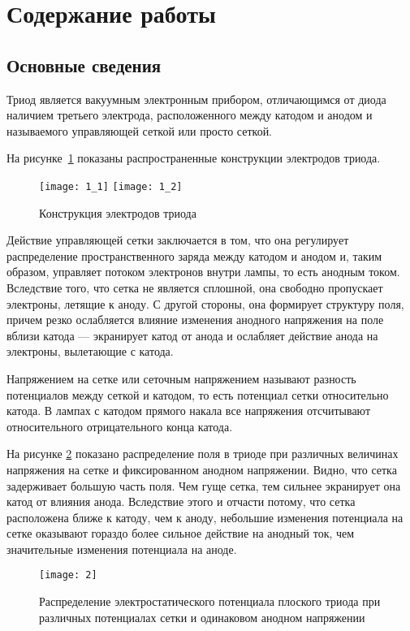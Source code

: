 \section{Содержание работы}

\subsection{Основные сведения}

Триод является вакуумным электронным прибором, отличающимся от диода наличием
третьего электрода, расположенного между катодом и анодом и называемого
управляющей сеткой или просто сеткой.

На рисунке~\ref{pic1} показаны распространенные конструкции электродов триода.
\begin{figure}[h!]
  \center
  \texttt{[image: 1\_1]} \hspace{2em}
  \texttt{[image: 1\_2]}
  \caption{Конструкция электродов триода}
  \label{pic1}
\end{figure}

Действие управляющей сетки заключается в том, что она регулирует распределение
пространственного заряда между катодом и анодом и, таким образом, управляет
потоком электронов внутри лампы, то есть анодным током. Вследствие того, что
сетка не является сплошной, она свободно пропускает электроны, летящие к аноду.
С другой стороны, она формирует структуру поля, причем резко ослабляется
влияние изменения анодного напряжения на поле вблизи катода --- экранирует
катод от анода и ослабляет действие анода на электроны, вылетающие с катода.

Напряжением на сетке или сеточным напряжением называют разность потенциалов
между сеткой и катодом, то есть потенциал сетки относительно катода. В лампах
с катодом прямого накала все напряжения отсчитывают относительного
отрицательного конца катода.

На рисунке \ref{pic2} показано распределение поля в триоде при различных
величинах напряжения на сетке и фиксированном анодном напряжении. Видно, что
сетка задерживает большую часть поля. Чем гуще сетка, тем сильнее экранирует
она катод от влияния анода. Вследствие этого и отчасти потому, что сетка
расположена ближе к катоду, чем к аноду, небольшие изменения потенциала на
сетке оказывают гораздо более сильное действие на анодный ток, чем значительные
изменения потенциала на аноде.

\begin{figure}[h!]
  \center
  \texttt{[image: 2]}
  \caption{Распределение электростатического потенциала плоского триода при
  различных потенциалах сетки и одинаковом анодном напряжении}
  \label{pic2}
\end{figure}

